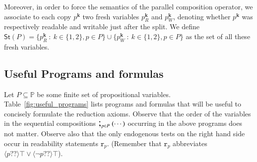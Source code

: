 \documentclass{llncs}
\newcommand{\cp}[2]{{#2}^\mathbf{#1}}
\newcommand{\cpr}[2]{\cp{#1}{#2}_R}
\newcommand{\cpw}[2]{\cp{#1}{#2}_W}
\newcommand{\readable}[1]{\mathtt{r}_{#1}}
\newcommand{\testendo}{?\!\!?}			%
\newcommand{\storeset}{\mathsf{St}}
\newcommand{\ldia}[1]{ \big\langle #1 \big\rangle}
\newcommand{\propset}{\mathbb P}
\newcommand{\seqseq}[1]{ \text{\Large ;}_{#1} ~ }
\newcommand{\set}[1]{\{#1\}}
\newcommand{\suchthat}{~ : ~}
\begin{document}
Moreover, in order to force the semantics of the parallel composition operator, we associate to each copy $\cp k p$ two fresh variables $\cpr k p$ and $\cpw k p$,
denoting whether $\cp k p$ was respectively readable and writable just after the split.
We define $\storeset(P) =
\set{ \cpr k p \suchthat k \in \set{1,2}, p \in P} \cup
\set{ \cpw k p \suchthat k \in \set{1,2}, p \in P}$ as the set of all these fresh variables.


\subsection{Useful Programs and formulas}\label{sec:usefulFml}

Let $P \subseteq \propset$ be some finite set of propositional variables. 
Table~\ref{fig:useful_programs} lists programs and formulas that will be useful to concisely formulate the reduction axioms.
%
Observe that the order of the variables in the sequential compositions $ \seqseq{p \in P} ( \cdots ) $ occurring in the above programs does not matter. 
Observe also that the only endogenous tests on the right hand side occur in readability statements $\readable p$. 
(Remember that $\readable p$ abbreviates $\ldia{ p \testendo} \top \lor \ldia{ \lnot p \testendo} \top $). 
\end{document}
